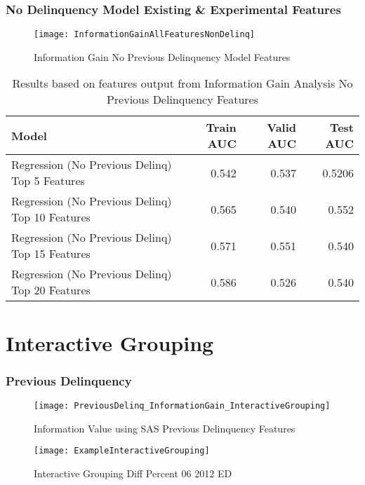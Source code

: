 \subsubsection{No Delinquency Model Existing \& Experimental Features}

\begin{figure}[H]
	\texttt{[image: InformationGainAllFeaturesNonDelinq]}
	\caption{Information Gain No Previous Delinquency Model Features}
	\label{fig:Information Gain No Previous Delinquency Model Features}
\end{figure}

\begin{table}[H]
	\centering
	\resizebox{\textwidth}{!}
	{
		\begin{tabular}{l | r | r| r}
			\hline
			\textbf{Model} & \textbf{Train AUC} & \textbf{Valid AUC} &  \textbf{Test AUC} \\
			\hline
			Regression (No Previous Delinq) Top 5 Features &  0.542 &  0.537 &  0.5206  \\
			Regression (No Previous Delinq) Top 10 Features &  0.565 &  0.540 &  0.552  \\			
			Regression (No Previous Delinq) Top 15 Features &  0.571 &  0.551 &  0.540  \\	
			Regression (No Previous Delinq) Top 20 Features &  0.586 &  0.526 &  0.540  \\		
			\hline
		\end{tabular}
	}
	\caption{Results based on features output from Information Gain Analysis No Previous Delinquency Features }
	\label{table:featureselection_base_model}
\end{table}

\section{Interactive Grouping}

\subsubsection{Previous Delinquency}
\begin{figure}[H]
	\texttt{[image: PreviousDelinq\_InformationGain\_InteractiveGrouping]}
	\caption{Information Value using SAS Previous Delinquency Features}
	\label{fig:Information Value using SAS Previous Delinquency Features}
\end{figure}

\begin{figure}[H]
	\texttt{[image: ExampleInteractiveGrouping]}
	\caption{Interactive Grouping Diff Percent 06 2012 ED}
	\label{fig:Interactive Grouping Diff Percent 06 2012 ED}
\end{figure}

